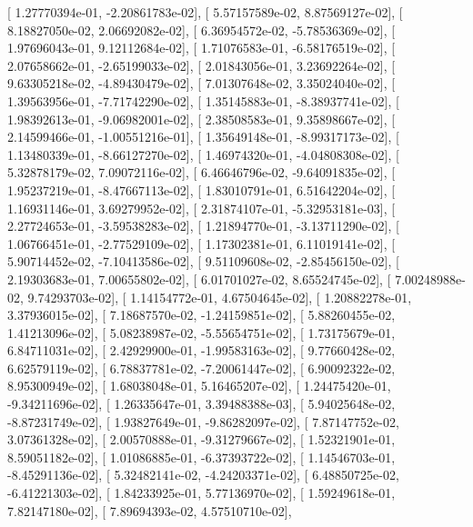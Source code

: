 \documentclass{article}
\begin{document}
       [  1.27770394e-01,  -2.20861783e-02],
       [  5.57157589e-02,   8.87569127e-02],
       [  8.18827050e-02,   2.06692082e-02],
       [  6.36954572e-02,  -5.78536369e-02],
       [  1.97696043e-01,   9.12112684e-02],
       [  1.71076583e-01,  -6.58176519e-02],
       [  2.07658662e-01,  -2.65199033e-02],
       [  2.01843056e-01,   3.23692264e-02],
       [  9.63305218e-02,  -4.89430479e-02],
       [  7.01307648e-02,   3.35024040e-02],
       [  1.39563956e-01,  -7.71742290e-02],
       [  1.35145883e-01,  -8.38937741e-02],
       [  1.98392613e-01,  -9.06982001e-02],
       [  2.38508583e-01,   9.35898667e-02],
       [  2.14599466e-01,  -1.00551216e-01],
       [  1.35649148e-01,  -8.99317173e-02],
       [  1.13480339e-01,  -8.66127270e-02],
       [  1.46974320e-01,  -4.04808308e-02],
       [  5.32878179e-02,   7.09072116e-02],
       [  6.46646796e-02,  -9.64091835e-02],
       [  1.95237219e-01,  -8.47667113e-02],
       [  1.83010791e-01,   6.51642204e-02],
       [  1.16931146e-01,   3.69279952e-02],
       [  2.31874107e-01,  -5.32953181e-03],
       [  2.27724653e-01,  -3.59538283e-02],
       [  1.21894770e-01,  -3.13711290e-02],
       [  1.06766451e-01,  -2.77529109e-02],
       [  1.17302381e-01,   6.11019141e-02],
       [  5.90714452e-02,  -7.10413586e-02],
       [  9.51109608e-02,  -2.85456150e-02],
       [  2.19303683e-01,   7.00655802e-02],
       [  6.01701027e-02,   8.65524745e-02],
       [  7.00248988e-02,   9.74293703e-02],
       [  1.14154772e-01,   4.67504645e-02],
       [  1.20882278e-01,   3.37936015e-02],
       [  7.18687570e-02,  -1.24159851e-02],
       [  5.88260455e-02,   1.41213096e-02],
       [  5.08238987e-02,  -5.55654751e-02],
       [  1.73175679e-01,   6.84711031e-02],
       [  2.42929900e-01,  -1.99583163e-02],
       [  9.77660428e-02,   6.62579119e-02],
       [  6.78837781e-02,  -7.20061447e-02],
       [  6.90092322e-02,   8.95300949e-02],
       [  1.68038048e-01,   5.16465207e-02],
       [  1.24475420e-01,  -9.34211696e-02],
       [  1.26335647e-01,   3.39488388e-03],
       [  5.94025648e-02,  -8.87231749e-02],
       [  1.93827649e-01,  -9.86282097e-02],
       [  7.87147752e-02,   3.07361328e-02],
       [  2.00570888e-01,  -9.31279667e-02],
       [  1.52321901e-01,   8.59051182e-02],
       [  1.01086885e-01,  -6.37393722e-02],
       [  1.14546703e-01,  -8.45291136e-02],
       [  5.32482141e-02,  -4.24203371e-02],
       [  6.48850725e-02,  -6.41221303e-02],
       [  1.84233925e-01,   5.77136970e-02],
       [  1.59249618e-01,   7.82147180e-02],
       [  7.89694393e-02,   4.57510710e-02],
\end{document}
